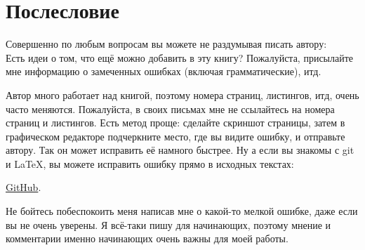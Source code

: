 \part*{Послесловие}


Совершенно по любым вопросам вы можете не раздумывая писать автору: \\
\GTT{\EMAILS}
Есть идеи о том, что ещё можно добавить в эту книгу?
Пожалуйста, присылайте мне информацию о замеченных ошибках (включая грамматические), итд.

Автор много работает над книгой, поэтому номера страниц, листингов, итд, очень часто меняются.
Пожалуйста, в своих письмах мне не ссылайтесь на номера страниц и листингов.
Есть метод проще: сделайте скриншот страницы, затем в графическом редакторе подчеркните место, где вы видите
ошибку, и отправьте автору. Так он может исправить её намного быстрее.
Ну а если вы знакомы с git и \LaTeX, вы можете исправить ошибку прямо в исходных текстах:

\href{http://go.yurichev.com/17089}{GitHub}.

Не бойтесь побеспокоить меня написав мне о какой-то мелкой ошибке, даже если вы не очень уверены.
Я всё-таки пишу для начинающих, поэтому мнение и комментарии именно начинающих очень важны для моей работы.

